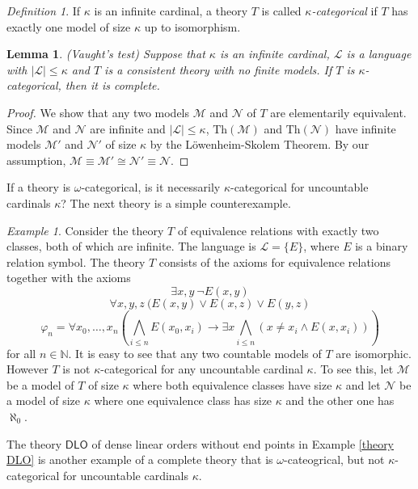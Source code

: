 \documentclass[a4paper, 11pt]{amsart}
\newtheorem{lemma}[lemma]{Lemma}
\theoremstyle{remark}
\newtheorem{definition}[definition]{Definition}
\newtheorem{example}[example]{Example}
\newcommand{\NN}{\mathbb{N}}
\newcommand{\Th}{\mathrm{Th}}
\newcommand{\cL}{\mathcal L}
\newcommand{\cM}{\mathcal M}
\newcommand{\cN}{\mathcal N}
\newcommand{\DLO}{\mathsf{DLO}}
\begin{document}
\begin{definition} 
If $\kappa$ is an infinite cardinal, a theory $T$ is called \emph{$\kappa$-categorical} if $T$ has exactly one model of size $\kappa$ up to isomorphism. 
\end{definition} 


\begin{lemma} \label{Vaught's test} (Vaught's test) 
Suppose that $\kappa$ is an infinite cardinal, $\cL$ is a language with $|\cL|\leq\kappa$ and $T$ is a consistent theory with no finite models. If $T$ is $\kappa$-categorical, then it is complete. 
\end{lemma} 
\begin{proof} 
We show that any two models $\cM$ and $\cN$ of $T$ are elementarily equivalent. 
Since $\cM$ and $\cN$ are infinite and $|\cL|\leq\kappa$, $\Th(\cM)$ and $\Th(\cN)$ have infinite models $\cM'$ and $\cN'$ of size $\kappa$ by the L\"owenheim-Skolem Theorem. By our assumption, $\cM\equiv \cM'\cong\cN'\equiv \cN$. 
\end{proof} 


If a theory is $\omega$-categorical, is it necessarily $\kappa$-categorical for uncountable cardinals $\kappa$? 
The next theory is a simple counterexample. 

\begin{example} 
Consider the theory $T$ of equivalence relations with exactly two classes, both of which are infinite. 
The language is $\cL = \{E\}$, where $E$ is a binary relation symbol. 
The theory $T$ consists of the axioms for equivalence relations together with the axioms 
$$\exists x, y\ \neg E(x,y)$$ 
$$\forall x,y,z\ (E(x,y)\vee E(x,z)\vee E(y,z)$$ 
$$\varphi_n=\forall x_0,\dots,x_n(\bigwedge_{i\leq n} E(x_0,x_i)\rightarrow \exists x \bigwedge_{i\leq n} (x\neq x_i\wedge E(x,x_i)))$$ 
for all $n\in\NN$. It is easy to see that any two countable models of $T$ are isomorphic. However $T$ is not $\kappa$-categorical for any uncountable cardinal $\kappa$. To see this, let $\cM$ be a model of $T$ of size $\kappa$ where both equivalence classes have size $\kappa$ and let $\cN$ be a model of size $\kappa$ where one equivalence class has size $\kappa$ and the other one has $\aleph_0$. 
\end{example} 

The theory $\DLO$ of dense linear orders without end points in Example \ref{theory DLO} is another example of a complete theory that is $\omega$-cateogrical, but not $\kappa$-categorical for uncountable cardinals $\kappa$. 
\end{document}
